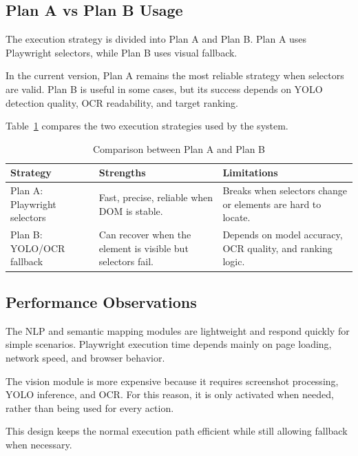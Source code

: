 \subsection{Plan A vs Plan B Usage}
\label{subsec:plan_a_plan_b_usage}

The execution strategy is divided into Plan A and Plan B. Plan A uses Playwright selectors, while Plan B uses visual fallback.

In the current version, Plan A remains the most reliable strategy when selectors are valid. Plan B is useful in some cases, but its success depends on YOLO detection quality, OCR readability, and target ranking.

Table~\ref{tab:plan_a_plan_b} compares the two execution strategies used by the system.

\begin{table}[H]
	\centering
	\caption{Comparison between Plan A and Plan B}
	\label{tab:plan_a_plan_b}
	\renewcommand{\arraystretch}{1.35}
	\small
	\begin{tabularx}{\textwidth}{|l|X|X|}
		\hline
		\rowcolor{gray!20}
		\textbf{Strategy} & \textbf{Strengths} & \textbf{Limitations} \\ \hline
		Plan A: Playwright selectors & Fast, precise, reliable when DOM is stable. & Breaks when selectors change or elements are hard to locate. \\ \hline
		Plan B: YOLO/OCR fallback & Can recover when the element is visible but selectors fail. & Depends on model accuracy, OCR quality, and ranking logic. \\ \hline
	\end{tabularx}
\end{table}

\subsection{Performance Observations}
\label{subsec:performance_observations}

The NLP and semantic mapping modules are lightweight and respond quickly for simple scenarios. Playwright execution time depends mainly on page loading, network speed, and browser behavior.

The vision module is more expensive because it requires screenshot processing, YOLO inference, and OCR. For this reason, it is only activated when needed, rather than being used for every action.

This design keeps the normal execution path efficient while still allowing fallback when necessary.

